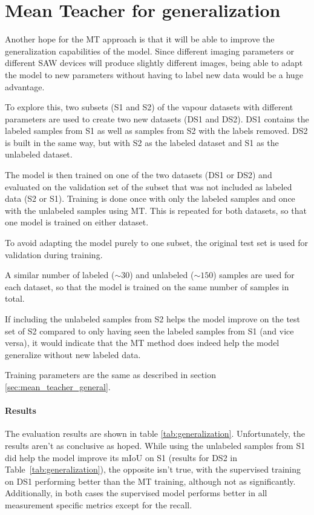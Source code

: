 \section{Mean Teacher for generalization}
\label{sec:generalization}

Another hope for the MT approach is that it will be able to improve the generalization capabilities of the model. Since different imaging parameters or different SAW devices will produce slightly different images, being able to adapt the model to new parameters without having to label new data would be a huge advantage.

To explore this, two subsets (S1 and S2) of the vapour datasets with different parameters are used to create two new datasets (DS1 and DS2). DS1 contains the labeled samples from S1 as well as samples from S2 with the labels removed. DS2 is built in the same way, but with S2 as the labeled dataset and S1 as the unlabeled dataset.

The model is then trained on one of the two datasets (DS1 or DS2) and evaluated on the validation set of the subset that was not included as labeled data (S2 or S1). Training is done once with only the labeled samples and once with the unlabeled samples using MT. This is repeated for both datasets, so that one model is trained on either dataset. 

To avoid adapting the model purely to one subset, the original test set is used for validation during training. 

A similar number of labeled ($\sim 30$) and unlabeled ($\sim 150$) samples are used for each dataset, so that the model is trained on the same number of samples in total.

If including the unlabeled samples from S2 helps the model improve on the test set of S2 compared to only having seen the labeled samples from S1 (and vice versa), it would indicate that the MT method does indeed help the model generalize without new labeled data.

Training parameters are the same as described in section \ref{sec:mean_teacher_general}.

\paragraph{Results}

The evaluation results are shown in table \ref{tab:generalization}. 
Unfortunately, the results aren't as conclusive as hoped. 
While using the unlabeled samples from S1 did help the model improve its mIoU on S1 (results for DS2 in Table~\ref{tab:generalization}), the opposite isn't true, with the supervised training on DS1 performing better than the MT training, although not as significantly. 
Additionally, in both cases the supervised model performs better in all measurement specific metrics except for the recall.

